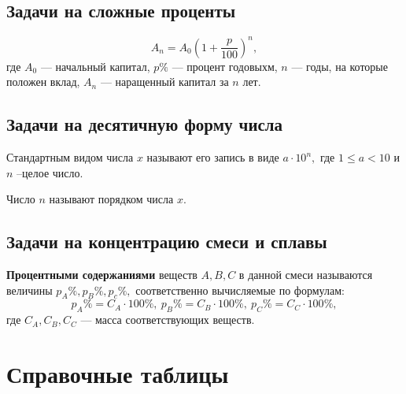 \documentclass[a4paper, 14pt]{extarticle}
\begin{document}
{\subsection{Задачи на сложные проценты}
$$A_n=A_0\left( 1+\frac{p}{100}\right)^n ,$$
где $A_0$ --- начальный капитал, $p\%$ --- процент годовыхм, $n$ --- годы, на которые положен вклад, $A_n$ --- наращенный капитал за $n$ лет. 
\subsection{Задачи на десятичную форму числа}
Стандартным видом числа $x$ называют его запись в виде $a\cdot 10^n,$ где $1\le a < 10$ и $n$ --целое число.

Число $n$ называют порядком числа $x.$ 

\subsection{Задачи на концентрацию смеси и сплавы}
\textbf{Процентными содержаниями} веществ $A, B, C$ в данной смеси называются величины $p_A\%, p_B\%, p_c\%,$ соответственно вычисляемые по формулам:
$$
p_A\%=C_A\cdot 100\%,\  p_B\%=C_B\cdot 100\%,\ p_C\%=C_C\cdot 100\%,
$$
где $C_A, C_B, C_C$ --- масса соответствующих веществ.

\section{Справочные таблицы}

}
\end{document}
